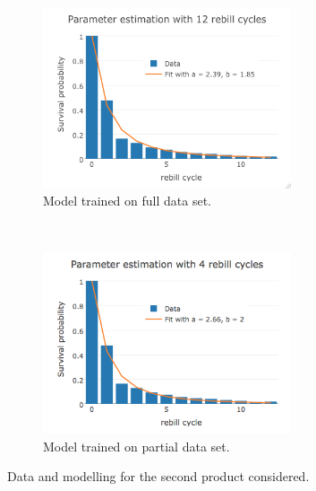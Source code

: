 \documentclass[paper=a4, fontsize=11pt]{scrartcl} %
\numberwithin{equation}{section} %
\numberwithin{figure}{section} %
\numberwithin{table}{section} %
\begin{document}
\begin{figure}[t!]
	\centering
	\begin{subfigure}[b]{0.5\textwidth}
		\centering
		\includegraphics[height=2.1in]{./figures/SV12cycles.png}
		\caption{Model trained on full data set.}
	\end{subfigure}%
	~ 
	\begin{subfigure}[b]{0.5\textwidth}
		\centering
		\includegraphics[height=2.1in]{./figures/SV4cycles.png}
		\caption{Model trained on partial data set.}
	\end{subfigure}
	\caption{Data and modelling for the second product considered.}
	\label{fig:SV}
\end{figure}
\end{document}
